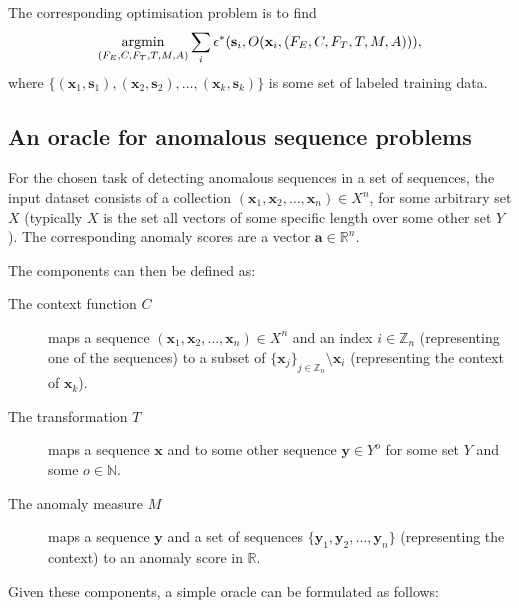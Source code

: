 The corresponding optimisation problem is to find
\[
    \argmin_{(F_E, C, F_T, T, M, A)} \sum_i \epsilon^*(\mathbf{s}_i, O(\mathbf{x}_i, (F_E, C, F_T, T, M, A))),
\]
where $\{(\mathbf{x}_1, \mathbf{s}_1), (\mathbf{x}_2, \mathbf{s}_2), \dots, (\mathbf{x}_k, \mathbf{s}_k)\}$ is some set of labeled training data.

\subsection{An oracle for anomalous sequence problems}
\label{sect:sequence_oracle}

For the chosen task of detecting anomalous sequences in a set of sequences, the input dataset consists of a collection $(\mathbf{x}_1, \mathbf{x}_2, \dots, \mathbf{x}_n) \in X^n$, for some arbitrary set $X$ (typically $X$ is the set all vectors of some specific length over some other set $Y$). The corresponding anomaly scores are a vector $\mathbf{a} \in \mathbb{R}^n$.

The components can then be defined as:
\begin{description}
    \item[The context function $C$] maps a sequence $(\mathbf{x}_1, \mathbf{x}_2, \dots, \mathbf{x}_n) \in X^n$ and an index $i \in \mathbb{Z}_n$ (representing one of the sequences) to a subset of ${\{\mathbf{x}_j\}}_{j \in \mathbb{Z}_n} \setminus \mathbf{x}_i$ (representing the context of $\mathbf{x}_k$).
    \item[The transformation $T$]maps a sequence $\mathbf{x}$ and to some other sequence $\mathbf{y} \in Y^o$ for some set $Y$ and some $o \in \mathbb{N}$.
    \item[The anomaly measure $M$] maps a sequence $\mathbf{y}$ and a set of sequences $\{\mathbf{y}_1, \mathbf{y}_2, \dots, \mathbf{y}_n\}$ (representing the context) to an anomaly score in $\mathbb{R}$.
\end{description}

Given these components, a simple oracle can be formulated as follows:
\begin{algorithmic}
     
    \EndFor{}
\end{algorithmic}

